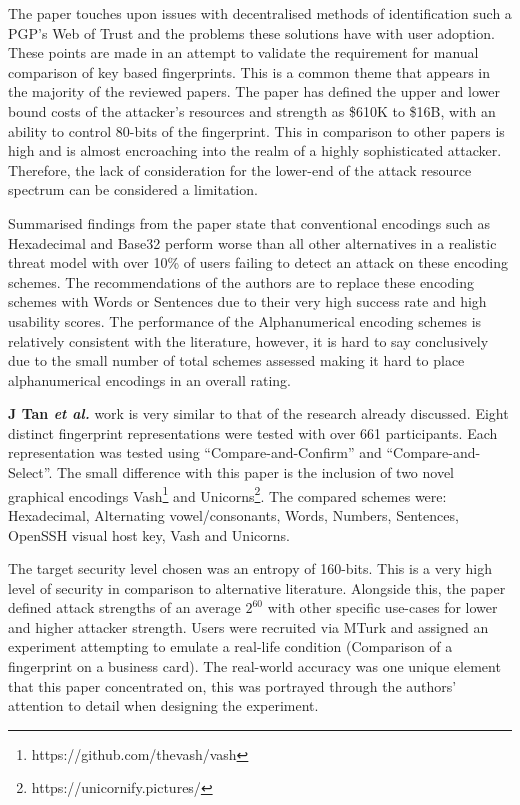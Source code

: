 The paper touches upon issues with decentralised methods of identification such a PGP's Web of Trust and the problems these solutions have with user adoption. These points are made in an attempt to validate the requirement for manual comparison of key based fingerprints. This is a common theme that appears in the majority of the reviewed papers. The paper has defined the upper and lower bound costs of the attacker's resources and strength as \$610K to \$16B, with an ability to control 80-bits of the fingerprint. This in comparison to other papers is high and is almost encroaching into the realm of a highly sophisticated attacker. Therefore, the lack of consideration for the lower-end of the attack resource spectrum can be considered a limitation.

Summarised findings from the paper state that conventional encodings such as Hexadecimal and Base32 perform worse than all other alternatives in a realistic threat model with over 10\% of users failing to detect an attack on these encoding schemes. The recommendations of the authors are to replace these encoding schemes with Words or Sentences due to their very high success rate and high usability scores. The performance of the Alphanumerical encoding schemes is relatively consistent with the literature, however, it is hard to say conclusively due to the small number of total schemes assessed making it hard to place alphanumerical encodings in an overall rating.

\textbf{J Tan \textit{et al.}}\cite{tan2017can} work is very similar to that of the research already discussed. Eight distinct fingerprint representations were tested with over 661 participants. Each representation was tested using ``Compare-and-Confirm'' and ``Compare-and-Select''. The small difference with this paper is the inclusion of two novel graphical encodings Vash\footnote{https://github.com/thevash/vash} and Unicorns\footnote{https://unicornify.pictures/}. The compared schemes were: Hexadecimal, Alternating vowel/consonants, Words, Numbers, Sentences, OpenSSH visual host key, Vash and Unicorns.

The target security level chosen was an entropy of 160-bits. This is a very high level of security in comparison to alternative literature. Alongside this, the paper defined attack strengths of an average $2^{60}$ with other specific use-cases for lower and higher attacker strength. Users were recruited via MTurk and assigned an experiment attempting to emulate a real-life condition (Comparison of a fingerprint on a business card). The real-world accuracy was one unique element that this paper concentrated on, this was portrayed through the authors' attention to detail when designing the experiment.

